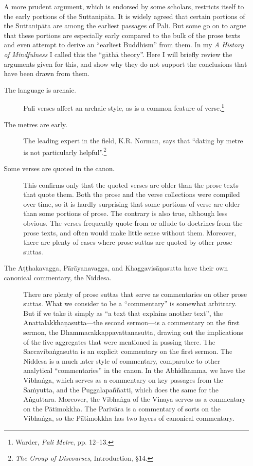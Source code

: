 \documentclass[12pt,openany]{book}%
\begin{document}
A more prudent argument, which is endorsed by some scholars, restricts itself to the early portions of the \textsanskrit{Suttanipāta}. It is widely agreed that certain portions of the \textsanskrit{Suttanipāta} are among the earliest passages of Pali. But some go on to argue that these portions are especially early compared to the bulk of the prose texts and even attempt to derive an “earliest Buddhism” from them. In my \textit{A History of Mindfulness} I called this the “\textsanskrit{gāthā} theory”. Here I will briefly review the arguments given for this, and show why they do not support the conclusions that have been drawn from them.

\begin{description}%
\item[The language is archaic.] Pali verses affect an archaic style, as is a common feature of verse.\footnote{Warder, \textit{Pali Metre}, pp. 12–13. }%
\item[The metres are early.] The leading expert in the field, K.R. Norman, says that “dating by metre is not particularly helpful”.\footnote{\textit{The Group of Discourses}, Introduction, §14. }%
\item[Some verses are quoted in the canon.] This confirms only that the quoted verses are older than the prose texts that quote them. Both the prose and the verse collections were compiled over time, so it is hardly surprising that some portions of verse are older than some portions of prose. The contrary is also true, although less obvious. The verses frequently quote from or allude to doctrines from the prose texts, and often would make little sense without them. Moreover, there are plenty of cases where prose suttas are quoted by other prose suttas.%
\item[The \textsanskrit{Aṭṭhakavagga}, \textsanskrit{Pārāyanavagga}, and \textsanskrit{Khaggavisāṇasutta} have their own canonical commentary, the Niddesa.] There are plenty of prose suttas that serve as commentaries on other prose suttas. What we consider to be a “commentary” is somewhat arbitrary. But if we take it simply as “a text that explains another text”, the \textsanskrit{Anattalakkhaṇasutta}—the second sermon—is a commentary on the first sermon, the Dhammacakkappavattanasutta, drawing out the implications of the five aggregates that were mentioned in passing there. The \textsanskrit{Saccavibaṅgasutta} is an explicit commentary on the first sermon. The Niddesa is a much later style of commentary, comparable to other analytical “commentaries” in the canon. In the Abhidhamma, we have the \textsanskrit{Vibhaṅga}, which serves as a commentary on key passages from the \textsanskrit{Saṁyutta}, and the \textsanskrit{Puggalapaññatti}, which does the same for the \textsanskrit{Aṅguttara}. Moreover, the \textsanskrit{Vibhaṅga} of the Vinaya serves as a commentary on the \textsanskrit{Pātimokkha}. The \textsanskrit{Parivāra} is a commentary of sorts on the \textsanskrit{Vibhaṅga}, so the \textsanskrit{Pātimokkha} has two layers of canonical commentary.%

\end{description}
\end{document}
